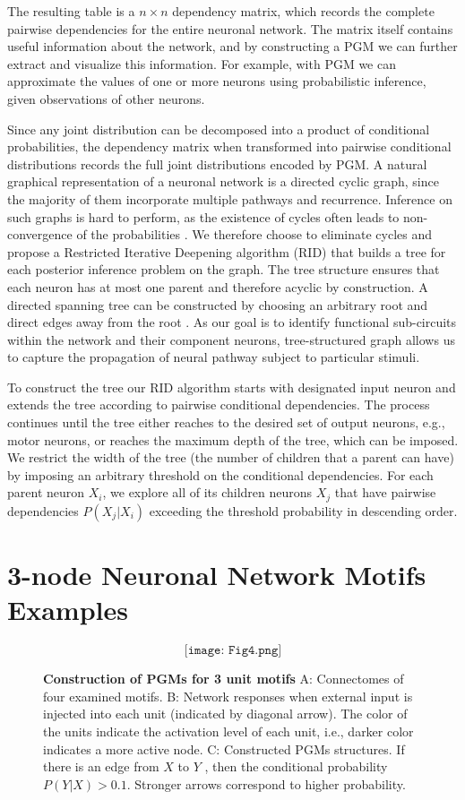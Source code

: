 \documentclass[letterpaper,11pt]{article}
\begin{document}
The resulting table is a $n\times n$ dependency matrix, which records the complete pairwise dependencies for the entire neuronal network. The matrix itself contains useful information about the network, and by constructing a PGM we can further extract and visualize this information. For example, with PGM we can approximate the values of one or more neurons using probabilistic inference, given observations of other neurons.

Since any joint distribution can be decomposed into a product of conditional probabilities, the dependency matrix when transformed into pairwise conditional distributions records the full joint distributions encoded by PGM. A natural graphical representation of a neuronal network is a directed cyclic graph, since the majority of them incorporate multiple pathways and recurrence. Inference on such graphs is hard to perform, as the existence of cycles often leads to non-convergence of the probabilities \cite{Koller}. We therefore choose to eliminate cycles and propose a Restricted Iterative Deepening algorithm (RID) that builds a tree for each posterior inference problem on the graph. The tree structure ensures that each neuron has at most one parent and therefore acyclic by construction. A directed spanning tree can be constructed by choosing an arbitrary root and direct edges away from the root \cite{Koller}. As our goal is to identify functional sub-circuits within the network and their component neurons, tree-structured graph allows us to capture the propagation of neural pathway subject to particular stimuli.

To construct the tree our RID algorithm starts with designated input neuron and extends the tree according to pairwise conditional dependencies. The process continues until the tree either reaches to the desired set of output neurons, e.g., motor neurons, or reaches the maximum depth of the tree, which can be imposed. We restrict the width of the tree (the number of children that a parent can have) by imposing an arbitrary threshold on the conditional dependencies. For each parent neuron $X_i$, we explore all of its children neurons $X_j$ that have pairwise dependencies $P(X_j|X_i)$ exceeding the threshold probability in descending order. 

\section{3-node Neuronal Network Motifs Examples}
\begin{figure}[h!]
  \[\texttt{[image: Fig4.png]}\]
  \caption{\textbf{Construction of PGMs for 3 unit motifs} A: Connectomes of four examined motifs. B: Network responses when external input is injected into each unit (indicated by diagonal arrow). The color of the units indicate the activation level of each unit, i.e., darker color indicates a more active node. C: Constructed PGMs structures. If there is an edge from $X$ to $Y$ , then the conditional probability $P(Y|X)>0.1$. Stronger arrows correspond to higher probability.}\label{fig:motifs}
\end{figure}
\end{document}
